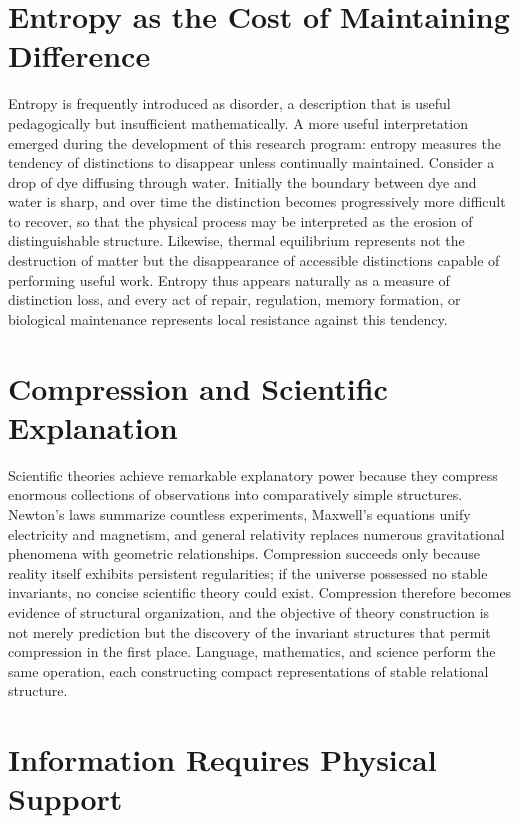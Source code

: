 \documentclass[11pt,oneside]{book}
\numberwithin{equation}{chapter}
\theoremstyle{definition}
\theoremstyle{plain}
\begin{document}
\section{Entropy as the Cost of Maintaining Difference}

Entropy is frequently introduced as disorder, a description that is useful pedagogically but insufficient mathematically. A more useful interpretation emerged during the development of this research program: entropy measures the tendency of distinctions to disappear unless continually maintained. Consider a drop of dye diffusing through water. Initially the boundary between dye and water is sharp, and over time the distinction becomes progressively more difficult to recover, so that the physical process may be interpreted as the erosion of distinguishable structure. Likewise, thermal equilibrium represents not the destruction of matter but the disappearance of accessible distinctions capable of performing useful work. Entropy thus appears naturally as a measure of distinction loss, and every act of repair, regulation, memory formation, or biological maintenance represents local resistance against this tendency.

\section{Compression and Scientific Explanation}

Scientific theories achieve remarkable explanatory power because they compress enormous collections of observations into comparatively simple structures. Newton's laws summarize countless experiments, Maxwell's equations unify electricity and magnetism, and general relativity replaces numerous gravitational phenomena with geometric relationships. Compression succeeds only because reality itself exhibits persistent regularities; if the universe possessed no stable invariants, no concise scientific theory could exist. Compression therefore becomes evidence of structural organization, and the objective of theory construction is not merely prediction but the discovery of the invariant structures that permit compression in the first place. Language, mathematics, and science perform the same operation, each constructing compact representations of stable relational structure.

\section{Information Requires Physical Support}
\end{document}
